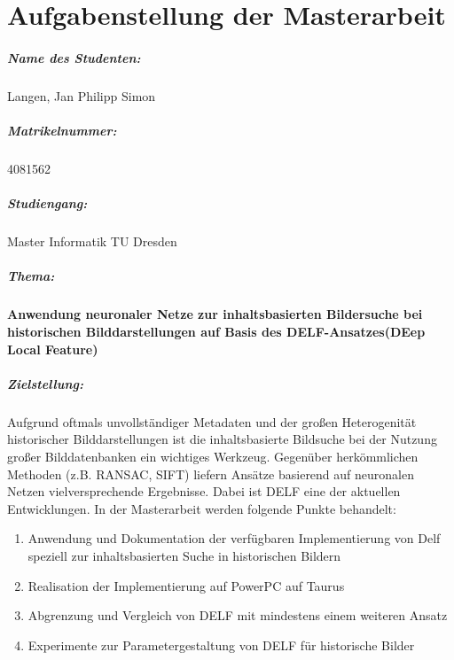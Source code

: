 \chapter*{Aufgabenstellung der Masterarbeit}

\paragraph{Name des Studenten:\qquad} Langen, Jan Philipp Simon
\paragraph{Matrikelnummer:\qquad\qquad\hspace{2pt}} 4081562
\paragraph{Studiengang:\hspace{63pt}} Master Informatik TU Dresden
\paragraph{Thema:\hspace{93.5pt}}
\parbox[t]{310pt}{
\textbf{Anwendung neuronaler Netze zur inhaltsbasierten Bildersuche bei historischen Bilddarstellungen auf Basis des DELF-Ansatzes(DEep Local Feature)}}
\paragraph{Zielstellung:\hspace{67.5pt}}\parbox[t]{310pt}{
Aufgrund oftmals unvollständiger Metadaten und der großen Heterogenität historischer Bilddarstellungen ist die inhaltsbasierte Bildsuche bei der Nutzung großer Bilddatenbanken ein wichtiges Werkzeug. Gegenüber herkömmlichen Methoden (z.B. RANSAC, SIFT) liefern Ansätze basierend auf neuronalen Netzen vielversprechende Ergebnisse. Dabei ist DELF eine der aktuellen Entwicklungen. In der Masterarbeit werden folgende Punkte behandelt:
\begin{enumerate}
\item Anwendung und Dokumentation der verfügbaren Implementierung von Delf speziell zur inhaltsbasierten Suche in historischen Bildern
\item Realisation der Implementierung auf PowerPC auf Taurus
\item Abgrenzung und Vergleich von DELF mit mindestens einem weiteren Ansatz
\item Experimente zur Parametergestaltung von DELF für historische Bilder 
\end{enumerate}
}
